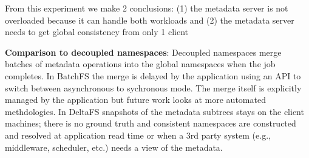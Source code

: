 From this experiment we make 2 conclusions: (1) the metadata server is not
overloaded because it can handle both workloads and (2) the metadata server
needs to get global consistency from only 1 client

\textbf{Comparison to decoupled namespaces}: Decoupled namespaces merge batches
of metadata operations into the global namespaces when the job completes.  In
BatchFS the merge is delayed by the application using an API to switch between
asynchronous to sychronous mode. The merge itself is explicitly managed by the
application but future work looks at more automated methdologies. In DeltaFS
snapshots of the metadata subtrees stays on the client machines; there is no
ground truth and consistent namespaces are constructed and resolved at
application read time or when a 3rd party system (e.g., middleware, scheduler,
etc.) needs a view of the metadata.


